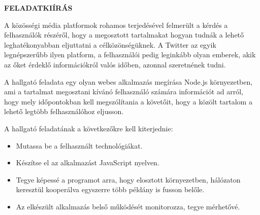 \clearpage
\begin{center}
\large
\textbf{FELADATKIÍRÁS}\\
\end{center}

A közösségi média platformok rohamos terjedésével felmerült a kérdés
a felhasználók részéről, hogy a megosztott tartalmakat hogyan tudnák a lehető
leghatékonyabban eljuttatni a célközönségüknek.
A Twitter az egyik legnépszerűbb ilyen platform, a felhasználói pedig leginkább
olyan emberek, akik az őket érdeklő információkról valós időben, azonnal
szeretnének tudni.

A hallgató feladata egy olyan webes alkalmazás megírása Node.js környezetben,
ami a tartalmat megosztani kívánó felhasználó számára információt ad arról,
hogy mely időpontokban kell megszólítania a követőit, hogy a közölt tartalom
a lehető legtöbb felhasználóhoz eljusson.

A hallgató feladatának a következőkre kell kiterjednie:

\begin{itemize}
\item Mutassa be a felhasznált technológiákat.
\item Készítse el az alkalmazást JavaScript nyelven.
\item Tegye képessé a programot arra, hogy elosztott környezetben,
  hálózaton keresztül kooperálva egyszerre több példány is fusson belőle.
\item Az elkészült alkalmazás belső működését monitorozza, tegye mérhetővé.
\end{itemize}
